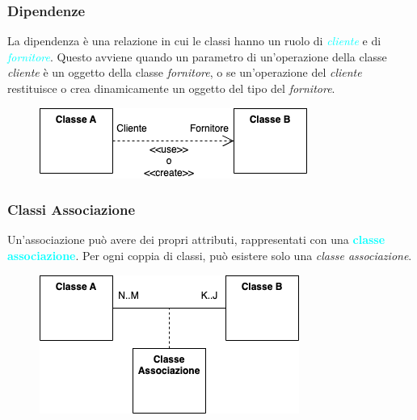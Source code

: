 \subsubsection{Dipendenze}
La dipendenza è una relazione in cui le classi hanno un ruolo di
\emph{\textcolor{cyan}{cliente}} e di \emph{\textcolor{cyan}{fornitore}}. Questo avviene quando
un parametro di un'operazione della classe \emph{cliente} è un oggetto della classe \emph{fornitore}, o se un'operazione
del \emph{cliente} restituisce o crea dinamicamente un oggetto del tipo del \emph{fornitore}.

\begin{figure}[h]
    \centering
    \includegraphics[scale=0.7]{img/dipendenza.png}
\end{figure}

\subsubsection{Classi Associazione}
Un'associazione può avere dei propri attributi, rappresentati con una \textbf{\textcolor{cyan}{classe associazione}}.
Per ogni coppia di classi, può esistere solo una \emph{classe associazione}.

\begin{figure}[h]
    \centering
    \includegraphics[scale=0.7]{img/classeass.png}
\end{figure}

